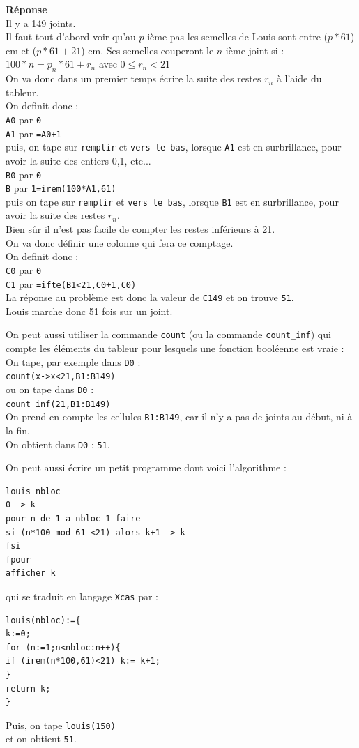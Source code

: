 \documentclass[a4paper,11pt]{book}
\begin{document}
{\bf R\'eponse}\\
Il y a 149 joints.\\
Il faut tout d'abord voir qu'au $p$-i\`eme pas les semelles de Louis sont entre
($p*61$) cm et ($p*61+21$) cm.
Ses semelles couperont le $n$-i\`eme joint si :\\
$100*n=p_n*61+r_n$ avec $0 \leq r_n<21$\\
On va donc dans un premier temps \'ecrire la suite des restes $r_n$ \`a l'aide
du tableur.\\
On definit donc :\\
{\tt A0} par {\tt 0}\\ 
{\tt A1} par {\tt =A0+1}\\
puis, on tape sur {\tt remplir} et {\tt vers le bas}, lorsque {\tt A1} est en 
surbrillance,
pour avoir la suite des entiers 0,1, etc...\\
{\tt B0} par {\tt 0}\\ 
{\tt B} par {\tt 1=irem(100*A1,61)}\\
puis on tape sur {\tt remplir}  et {\tt vers le bas}, lorsque {\tt B1} est en 
surbrillance,
pour avoir la suite des restes $r_n$.\\
Bien s\^ur il n'est pas facile de compter les restes inf\'erieurs \`a 21.\\
On va donc d\'efinir une colonne qui fera ce comptage.\\
On definit donc :\\
{\tt C0} par {\tt 0}\\
{\tt C1} par {\tt =ifte(B1<21,C0+1,C0)}\\ 
La r\'eponse au probl\`eme est donc la valeur de {\tt C149} et on trouve 
{\tt 51}.\\
 Louis marche donc 51 fois sur un joint.
 
On peut aussi utiliser la commande {\tt count} (ou la commande 
{\tt count\_inf}) qui compte les \'el\'ements
du tableur pour lesquels une fonction bool\'eenne est vraie :\\
On tape, par exemple dans {\tt D0} :\\
{\tt count(x->x<21,B1:B149)} \\
ou on tape dans {\tt D0} :\\
{\tt count\_inf(21,B1:B149)} \\
On prend en compte les cellules {\tt B1:B149}, car il n'y a pas de joints au 
d\'ebut, ni \`a la fin.\\
On obtient dans {\tt D0} : {\tt 51}.

On peut aussi \'ecrire un petit programme dont voici l'algorithme :
\begin{verbatim}
louis nbloc
0 -> k
pour n de 1 a nbloc-1 faire
si (n*100 mod 61 <21) alors k+1 -> k 
fsi
fpour
afficher k
\end{verbatim}
qui se traduit en langage {\tt Xcas} par :
\begin{verbatim}
louis(nbloc):={
k:=0;
for (n:=1;n<nbloc:n++){
if (irem(n*100,61)<21) k:= k+1; 
}
return k;
}
\end{verbatim}
Puis, on tape {\tt louis(150)}\\
et on obtient {\tt 51}.
\end{document}
